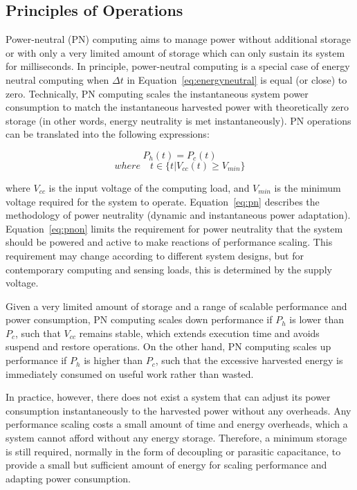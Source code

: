 \subsection{Principles of Operations}

Power-neutral (PN) computing aims to manage power without additional storage or with only a very limited amount of storage which can only sustain its system for milliseconds. In principle, power-neutral computing is a special case of energy neutral computing when $\Delta t$ in Equation~\ref{eq:energyneutral} is equal (or close) to zero. Technically, PN computing scales the instantaneous system power consumption to match the instantaneous harvested power with theoretically zero storage (in other words, energy neutrality is met instantaneously). PN operations can be translated into the following expressions:

\begin{equation} \label{eq:pn}
    P_h(t) = P_c(t)
\end{equation}
\begin{equation} \label{eq:pnon}
    where\quad t \in \{t|V_{cc}(t) \geq V_{min}\}
\end{equation}

where $V_{cc}$ is the input voltage of the computing load, and $V_{min}$ is the minimum voltage required for the system to operate. Equation~\ref{eq:pn} describes the methodology of power neutrality (dynamic and instantaneous power adaptation). Equation~\ref{eq:pnon} limits the requirement for power neutrality that the system should be powered and active to make reactions of performance scaling. This requirement may change according to different system designs, but for contemporary computing and sensing loads, this is determined by the supply voltage. 

Given a very limited amount of storage and a range of scalable performance and power consumption, PN computing scales down performance if $P_h$ is lower than $P_c$, such that $V_{cc}$ remains stable, which extends execution time and avoids suspend and restore operations. On the other hand, PN computing scales up performance if $P_h$ is higher than $P_c$, such that the excessive harvested energy is immediately consumed on useful work rather than wasted.

In practice, however, there does not exist a system that can adjust its power consumption instantaneously to the harvested power without any overheads. Any performance scaling costs a small amount of time and energy overheads, which a system cannot afford without any energy storage. Therefore, a minimum storage is still required, normally in the form of decoupling or parasitic capacitance, to provide a small but sufficient amount of energy for scaling performance and adapting power consumption.

